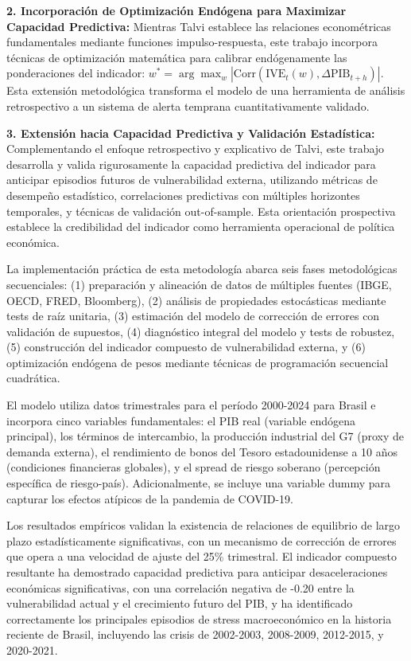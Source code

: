 \documentclass[3p,11pt]{elsarticle}
\begin{document}
\textbf{2. Incorporación de Optimización Endógena para Maximizar Capacidad Predictiva:} Mientras Talvi establece las relaciones econométricas fundamentales mediante funciones impulso-respuesta, este trabajo incorpora técnicas de optimización matemática para calibrar endógenamente las ponderaciones del indicador: $w^* = \arg \max_w |\text{Corr}(\text{IVE}_t(w), \Delta \text{PIB}_{t+h})|$. Esta extensión metodológica transforma el modelo de una herramienta de análisis retrospectivo a un sistema de alerta temprana cuantitativamente validado.

\textbf{3. Extensión hacia Capacidad Predictiva y Validación Estadística:} Complementando el enfoque retrospectivo y explicativo de Talvi, este trabajo desarrolla y valida rigurosamente la capacidad predictiva del indicador para anticipar episodios futuros de vulnerabilidad externa, utilizando métricas de desempeño estadístico, correlaciones predictivas con múltiples horizontes temporales, y técnicas de validación out-of-sample. Esta orientación prospectiva establece la credibilidad del indicador como herramienta operacional de política económica.

La implementación práctica de esta metodología abarca seis fases metodológicas secuenciales: (1) preparación y alineación de datos de múltiples fuentes (IBGE, OECD, FRED, Bloomberg), (2) análisis de propiedades estocásticas mediante tests de raíz unitaria, (3) estimación del modelo de corrección de errores con validación de supuestos, (4) diagnóstico integral del modelo y tests de robustez, (5) construcción del indicador compuesto de vulnerabilidad externa, y (6) optimización endógena de pesos mediante técnicas de programación secuencial cuadrática.

El modelo utiliza datos trimestrales para el período 2000-2024 para Brasil e incorpora cinco variables fundamentales: el PIB real (variable endógena principal), los términos de intercambio, la producción industrial del G7 (proxy de demanda externa), el rendimiento de bonos del Tesoro estadounidense a 10 años (condiciones financieras globales), y el spread de riesgo soberano (percepción específica de riesgo-país). Adicionalmente, se incluye una variable dummy para capturar los efectos atípicos de la pandemia de COVID-19.

Los resultados empíricos validan la existencia de relaciones de equilibrio de largo plazo estadísticamente significativas, con un mecanismo de corrección de errores que opera a una velocidad de ajuste del 25\% trimestral. El indicador compuesto resultante ha demostrado capacidad predictiva para anticipar desaceleraciones económicas significativas, con una correlación negativa de -0.20 entre la vulnerabilidad actual y el crecimiento futuro del PIB, y ha identificado correctamente los principales episodios de stress macroeconómico en la historia reciente de Brasil, incluyendo las crisis de 2002-2003, 2008-2009, 2012-2015, y 2020-2021.
\end{document}
